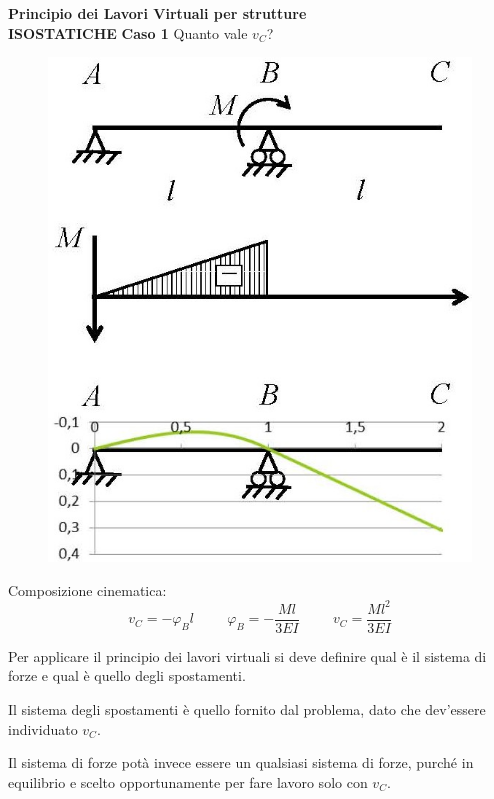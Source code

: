 \documentclass{article}
\begin{document}
\begin{adjustwidth}{2in}{}
{\Large \textbf{Principio dei Lavori Virtuali per strutture \\ ISOSTATICHE}} \newline 
\textbf{Caso 1}	\newline
		Quanto vale $v_C$?
		
\begin{figure}[H]
	\centering
	\includegraphics[width=0.4\linewidth]{"immagini/1.PARTE8_Pagina_64"}	
\end{figure}

		Composizione cinematica: 
		\[v_C = -\varphi_Bl \hspace{1cm} \varphi_B = -\dfrac{Ml}{3EI} \hspace{1cm} v_C = \dfrac{Ml^2}{3EI}\]


		Per applicare il principio dei lavori virtuali si
		deve definire qual è il sistema di forze e qual è
		quello degli spostamenti.
		
		
		Il sistema degli spostamenti è quello fornito dal
		problema, dato che dev’essere individuato $ v_C $.
		
		Il sistema di forze potà invece essere un qualsiasi sistema di forze, purché in
		equilibrio e scelto opportunamente per fare 
		lavoro solo con $ v_C $.
		

\end{adjustwidth}
\end{document}
